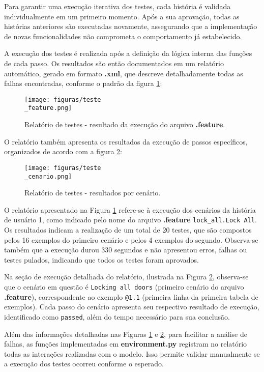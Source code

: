 Para garantir uma execução iterativa dos testes, cada história é validada individualmente em um primeiro momento. Após a sua aprovação, todas as histórias anteriores 
são executadas novamente, assegurando que a implementação de novas funcionalidades não comprometa o comportamento já estabelecido.

A execução dos testes é realizada após a definição da lógica interna das funções de cada passo. Os resultados são então documentados em um relatório automático, gerado 
em formato \textbf{.xml}, que descreve detalhadamente todas as falhas encontradas, conforme o padrão da figura \ref{fig:relatoriofeature}:

\begin{figure}[H]
\centering
\texttt{[image: figuras/teste\\\_feature.png]}
\caption{Relatório de testes - resultado da execução do arquivo \textbf{.feature}.}
\label{fig:relatoriofeature}
\end{figure}

O relatório também apresenta os resultados da execução de passos específicos, organizados de acordo com a figura \ref{fig:relatoriocenario}:

\begin{figure}[H]
\centering
\texttt{[image: figuras/teste\\\_cenario.png]}
\caption{Relatório de testes - resultados por cenário.}
\label{fig:relatoriocenario}
\end{figure}

O relatório apresentado na Figura \ref{fig:relatoriofeature} refere-se à execução dos cenários da história de usuário 1, como indicado pelo nome do arquivo 
\textbf{.feature} \texttt{lock\_all.Lock All}. Os resultados indicam a realização de um total de 20 testes, que são compostos pelos 16 exemplos do primeiro 
cenário e pelos 4 exemplos do segundo. Observa-se também que a execução durou 330 segundos e não apresentou erros, falhas ou testes pulados, indicando que 
todos os testes foram aprovados.

Na seção de execução detalhada do relatório, ilustrada na Figura \ref{fig:relatoriocenario}, observa-se que o cenário em questão é \texttt{Locking all doors} 
(primeiro cenário do arquivo \textbf{.feature}), correspondente ao exemplo \texttt{@1.1} (primeira linha da primeira tabela de exemplos). Cada passo do 
cenário apresenta seu respectivo resultado de execução, identificado como \texttt{passed}, além do tempo necessário para sua conclusão.

Além das informações detalhadas nas Figuras \ref{fig:relatoriofeature} e \ref{fig:relatoriocenario}, para facilitar a análise de falhas, as funções implementadas 
em \textbf{environment.py} registram no relatório todas as interações realizadas com o modelo. Isso permite validar manualmente se a execução dos testes ocorreu 
conforme o esperado.

